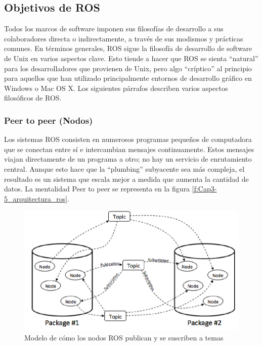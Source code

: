     \newpage

        
    \subsection{Objetivos de ROS}
    
        Todos los marcos de software imponen sus filosofías de desarrollo a sus colaboradores directa o indirectamente, a través de sus modismos y prácticas comunes. En términos generales, ROS sigue la filosofía de desarrollo de software de Unix en varios aspectos clave. Esto tiende a hacer que ROS se sienta ``natural'' para los desarrolladores que provienen de Unix, pero algo ``críptico'' al principio para aquellos que han utilizado principalmente entornos de desarrollo gráfico en Windows o Mac OS X. Los siguientes párrafos describen varios aspectos filosóficos de ROS.
        
        \subsubsection{Peer to peer (Nodos)}
        
            Los sistemas ROS consisten en numerosos programas pequeños de computadora que se conectan entre sí e intercambian mensajes continuamente. Estos mensajes viajan directamente de un programa a otro; no hay un servicio de enrutamiento central. Aunque esto hace que la ``plumbing'' subyacente sea más compleja, el resultado es un sistema que escala mejor a medida que aumenta la cantidad de datos. La mentalidad Peer to peer se representa en la figura \eqref{f:Cap3-5_arquitectura_ros}.
            
            \begin{figure}[htb]
                \centering
                \includegraphics[width=0.8\linewidth]{Main/Chapter3/Images3/arquitectura_por_nodos_1.png}
                \caption{Modelo de cómo los nodos ROS publican y se suscriben a temas \cite{naval_delta}}
                \label{f:Cap3-5_arquitectura_ros}
            \end{figure}
            
